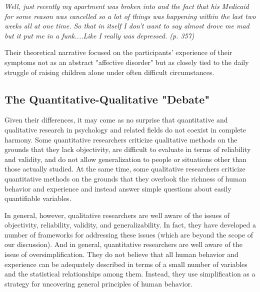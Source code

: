 \emph{Well, just recently my apartment was broken into and the fact that his Medicaid for some reason was cancelled so a lot of things was happening within the last two weeks all at one time. So that in itself I don't want to say almost drove me mad but it put me in a funk....Like I really was depressed. (p. 357)}

Their theoretical narrative focused on the participants' experience of their symptoms not as an abstract "affective disorder" but as closely tied to the daily struggle of raising children alone under often difficult circumstances.
     
\subsection{The Quantitative-Qualitative "Debate"}

Given their differences, it may come as no surprise that quantitative and qualitative research in psychology and related fields do not coexist in complete harmony. Some quantitative researchers criticize qualitative methods on the grounds that they lack objectivity, are difficult to evaluate in terms of reliability and validity, and do not allow generalization to people or situations other than those actually studied. At the same time, some qualitative researchers criticize quantitative methods on the grounds that they overlook the richness of human behavior and experience and instead answer simple questions about easily quantifiable variables.

In general, however, qualitative researchers are well aware of the issues of objectivity, reliability, validity, and generalizability. In fact, they have developed a number of frameworks for addressing these issues (which are beyond the scope of our discussion). And in general, quantitative researchers are well aware of the issue of oversimplification. They do not believe that all human behavior and experience can be adequately described in terms of a small number of variables and the statistical relationships among them. Instead, they use simplification as a strategy for uncovering general principles of human behavior.

